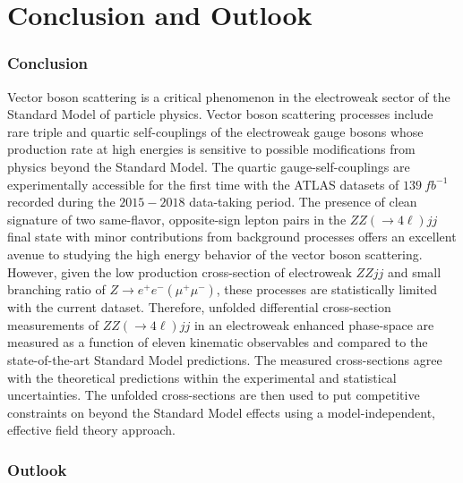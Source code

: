\part {\LARGE{Conclusion and Outlook}}

\section{Conclusion}
\label{sec:Conclusion}

Vector boson scattering is a critical phenomenon in the electroweak sector of the Standard Model of particle physics. Vector boson scattering processes include rare triple and quartic self-couplings of the electroweak gauge bosons whose production rate at high energies is sensitive to possible modifications from physics beyond the Standard Model. The quartic gauge-self-couplings are experimentally accessible for the first time with the ATLAS datasets of $139 ~fb^{-1}$ recorded during the $2015-2018$ data-taking period. The presence of clean signature of two same-flavor, opposite-sign lepton pairs in the $ZZ (\rightarrow 4\ell) jj$ final state with minor contributions from background processes offers an excellent avenue to studying the high energy behavior of the vector boson scattering. However, given the low production cross-section of electroweak $ZZjj$ and small branching ratio of $Z\rightarrow e^+e^- (\mu^+\mu^-)$, these processes are statistically limited with the current dataset. Therefore, unfolded differential cross-section measurements of $ZZ (\rightarrow 4\ell) jj$ in an electroweak enhanced phase-space are measured as a function of eleven kinematic observables and compared to the state-of-the-art Standard Model predictions. The measured cross-sections agree with the theoretical predictions within the experimental and statistical uncertainties. The unfolded cross-sections are then used to put competitive constraints on beyond the Standard Model effects using a model-independent, effective field theory approach. 

\section{Outlook}
\label{sec:Outlook}

